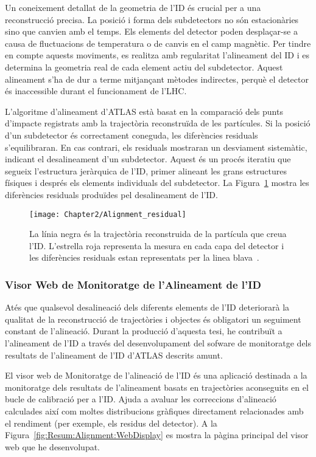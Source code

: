 Un coneixement detallat de la geometria de l'ID és crucial per a una reconstrucció precisa.
La posició i forma dels subdetectors no són estacionàries sino que canvien amb el temps.
Els elements del detector poden 
desplaçar-se a causa de fluctuacions de temperatura o de canvis en el camp magnètic. 
Per tindre en compte aquests moviments, es realitza amb regularitat l'alineament
del ID i es determina la geometria real de cada element actiu del subdetector.
Aquest alineament s'ha de dur a terme mitjançant mètodes indirectes, perquè el detector 
és inaccessible durant el funcionament de l'LHC.

L'algoritme d'alineament d'ATLAS està basat en la comparació dels punts d'impacte registrats 
amb la trajectòria reconstruïda de les partícules. Si la posició d'un subdetector és correctament 
coneguda, les diferències residuals s'equilibraran. En cas contrari, els residuals mostraran un 
desviament sistemàtic, indicant el desalineament d'un subdetector.   
Aquest és un procés iteratiu que  segueix l'estructura jeràrquica de l'ID, primer alineant les grans 
estructures físiques i després els elements individuals del subdetector.
La Figura~\ref{fig:Resum:Alignment:Residual} mostra les diferències residuals produïdes
pel desalineament de l'ID.

\begin{figure}[h]
	\centering
	\texttt{[image: Chapter2/Alignment\_residual]}
	\caption{La línia negra és la trajectòria reconstruida de la partícula que creua l'ID.
	L'estrella roja representa la mesura en cada capa del detector i les diferències residuals
	estan representats per la linea blava~\cite{ATLAS:2020ixw}.  }
\label{fig:Resum:Alignment:Residual}
\end{figure}

\subsubsection{Visor Web de Monitoratge de l'Alineament de l'ID}
Atés que qualsevol desalineació dels diferents elements de l'ID deteriorarà la qualitat de la 
reconstrucció de trajectòries i objectes és obligatori un seguiment constant de l'alineació.
Durant la producció d'aquesta tesi, he contribuït a l'alineament de l'ID a través del desenvolupament 
del sofware de monitoratge dels resultats de l'alineament de l'ID d’ATLAS descrits amunt. 

El visor web de Monitoratge de l'alineació de l'ID és una aplicació destinada a la monitoratge dels resultats 
de l'alineament basats en trajectòries aconseguits en el bucle de calibració per a l'ID. Ajuda a avaluar les 
correccions d'alineació calculades així com moltes distribucions gràfiques directament relacionades amb el 
rendiment (per exemple, els residus del detector).  A la Figura~\ref{fig:Resum:Alignment:WebDisplay} es
mostra la pàgina principal del visor web que he desenvolupat. 

